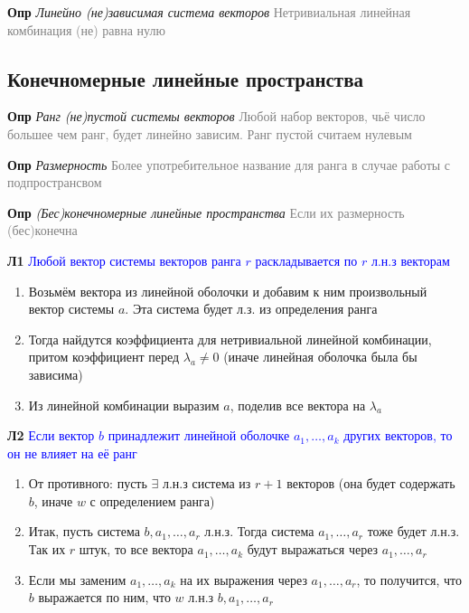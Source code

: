 \documentclass[a4paper, 14pt]{article}
\begin{document}
    \textbf{Опр} \textit{Линейно (не)зависимая система векторов}
    \textcolor{gray}{Нетривиальная линейная комбинация (не) равна нулю}

    \subsection{Конечномерные линейные пространства}

    \textbf{Опр} \textit{Ранг (не)пустой системы векторов}
    \textcolor{gray}{Любой набор векторов, чьё число большее чем ранг, будет линейно зависим. Ранг пустой считаем
    нулевым}

    \textbf{Опр} \textit{Размерность}
    \textcolor{gray}{Более употребительное название для ранга в случае работы с подпространсвом}

    \textbf{Опр} \textit{(Бес)конечномерные линейные пространства}
    \textcolor{gray}{Если их размерность (бес)конечна}

    \textbf{Л1} \textcolor{blue}{Любой вектор системы векторов ранга $r$ раскладывается по $r$ л.н.з векторам}

    \begin{enumerate}
        \item Возьмём вектора из линейной оболочки и добавим к ним произвольный вектор системы $a$.
        Эта система будет л.з. из определения ранга
        \item Тогда найдутся коэффициента для нетривиальной линейной комбинации, притом коэффициент перед
        $\lambda_a \neq 0$ (иначе линейная оболочка была бы зависима)
        \item Из линейной комбинации выразим $a$, поделив все вектора на $\lambda_a$
    \end{enumerate}

    \textbf{Л2} \textcolor{blue}{Если вектор $b$ принадлежит линейной оболочке $a_1, \dots, a_k$ других векторов, то
    он не влияет на её ранг}

    \begin{enumerate}
        \item От противного: пусть $\exists$ л.н.з система из $r+1$ векторов (она будет содержать $b$, иначе $w$ с
        определением ранга)
        \item Итак, пусть система $b, a_1, \dots, a_r$ л.н.з. Тогда система $a_1, \dots, a_r$ тоже будет л.н.з. Так
        их $r$ штук, то все вектора $a_1, \dots, a_k$ будут выражаться через $a_1, \dots, a_r$
        \item Если мы заменим $a_1, \dots, a_k$ на их выражения через $a_1, \dots, a_r$, то получится, что $b$
        выражается по ним, что $w$ л.н.з $b, a_1, \dots, a_r$
    \end{enumerate}
\end{document}
